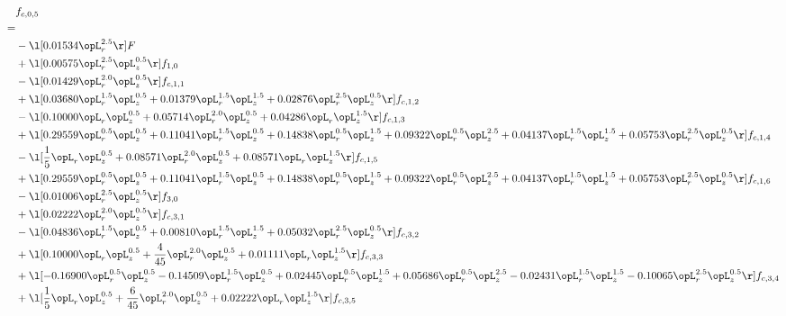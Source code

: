 \begin{alignat}{2} 
\label{eq:f_05_1} 
& f_{c,0,5} \nonumber \\ 
 = \\ 
& - \l[  0.01534 \opL_r^{2.5}  \r] F \nonumber \\ 
& + \l[  0.00575 \opL_r^{2.5} \opL_z^{0.5}  \r] f_{1,0} \nonumber \\ 
& - \l[  0.01429 \opL_r^{2.0} \opL_z^{0.5}  \r] f_{c,1,1} \nonumber \\ 
& + \l[  0.03680 \opL_r^{1.5} \opL_z^{0.5} +  0.01379 \opL_r^{1.5} \opL_z^{1.5} +  0.02876 \opL_r^{2.5} \opL_z^{0.5}  \r] f_{c,1,2} \nonumber \\ 
& - \l[  0.10000 \opL_r \opL_z^{0.5} +  0.05714 \opL_r^{2.0} \opL_z^{0.5} +  0.04286 \opL_r \opL_z^{1.5}  \r] f_{c,1,3} \nonumber \\ 
& + \l[  0.29559 \opL_r^{0.5} \opL_z^{0.5} +  0.11041 \opL_r^{1.5} \opL_z^{0.5} +  0.14838 \opL_r^{0.5} \opL_z^{1.5} +  0.09322 \opL_r^{0.5} \opL_z^{2.5} +  0.04137 \opL_r^{1.5} \opL_z^{1.5} +  0.05753 \opL_r^{2.5} \opL_z^{0.5}  \r] f_{c,1,4} \nonumber \\ 
& - \l[ \frac{1}{5} \opL_r \opL_z^{0.5} +  0.08571 \opL_r^{2.0} \opL_z^{0.5} +  0.08571 \opL_r \opL_z^{1.5}  \r] f_{c,1,5} \nonumber \\ 
& + \l[  0.29559 \opL_r^{0.5} \opL_z^{0.5} +  0.11041 \opL_r^{1.5} \opL_z^{0.5} +  0.14838 \opL_r^{0.5} \opL_z^{1.5} +  0.09322 \opL_r^{0.5} \opL_z^{2.5} +  0.04137 \opL_r^{1.5} \opL_z^{1.5} +  0.05753 \opL_r^{2.5} \opL_z^{0.5}  \r] f_{c,1,6} \nonumber \\ 
& - \l[  0.01006 \opL_r^{2.5} \opL_z^{0.5}  \r] f_{3,0} \nonumber \\ 
& + \l[  0.02222 \opL_r^{2.0} \opL_z^{0.5}  \r] f_{c,3,1} \nonumber \\ 
& - \l[  0.04836 \opL_r^{1.5} \opL_z^{0.5} +  0.00810 \opL_r^{1.5} \opL_z^{1.5} +  0.05032 \opL_r^{2.5} \opL_z^{0.5}  \r] f_{c,3,2} \nonumber \\ 
& + \l[  0.10000 \opL_r \opL_z^{0.5} + \frac{4}{45} \opL_r^{2.0} \opL_z^{0.5} +  0.01111 \opL_r \opL_z^{1.5}  \r] f_{c,3,3} \nonumber \\ 
& + \l[  -0.16900 \opL_r^{0.5} \opL_z^{0.5}   -0.14509 \opL_r^{1.5} \opL_z^{0.5} +  0.02445 \opL_r^{0.5} \opL_z^{1.5} +  0.05686 \opL_r^{0.5} \opL_z^{2.5}   -0.02431 \opL_r^{1.5} \opL_z^{1.5}   -0.10065 \opL_r^{2.5} \opL_z^{0.5}  \r] f_{c,3,4} \nonumber \\ 
& + \l[ \frac{1}{5} \opL_r \opL_z^{0.5} + \frac{6}{45} \opL_r^{2.0} \opL_z^{0.5} +  0.02222 \opL_r \opL_z^{1.5}  \r] f_{c,3,5} \nonumber \\ 

\end{alignat}
